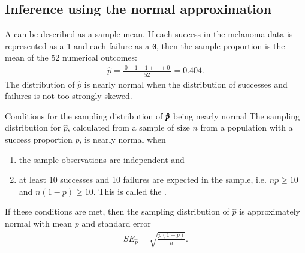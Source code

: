 \subsection{Inference using the normal approximation}
\label{normalApproxSingleBinomial}

A  can be described as a sample mean. If each success in the melanoma data  is represented as a \texttt{1} and each failure as a \texttt{0}, then the sample proportion is the mean of the 52 numerical outcomes:
\begin{eqnarray*}
\hat{p} = \frac{\ 0 + 1 + 1 + \cdots + 0\ }{52} = 0.404.
\end{eqnarray*}
The distribution of $\hat{p}$ is nearly normal when the distribution of successes and failures is not too strongly skewed.

\textD{\newpage}


\begin{onebox}{Conditions for the sampling distribution of $\pmb{\hat{\MakeLowercase{p}}}$ being nearly normal}
The sampling distribution for $\hat{p}$, calculated from a sample of size $n$ from a population with a success proportion $p$, is nearly normal when
\begin{enumerate}
\item the sample observations are independent and
\item at least 10 successes and 10 failures are expected in the sample, i.e. $np\geq10$ and $n(1-p)\geq10$. This is called the .
\end{enumerate}
If these conditions are met, then the sampling distribution of $\hat{p}$ is approximately normal with mean $p$ and standard error
\begin{eqnarray}
SE_{\hat{p}} = \sqrt{\frac{p(1-p)}{n}}.
\label{seOfPHat}
\end{eqnarray}
\end{onebox}%

